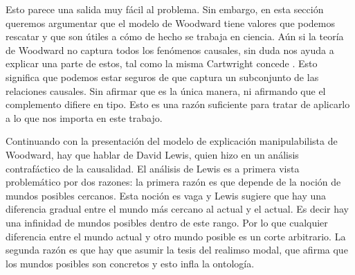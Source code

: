 Esto parece una salida muy fácil al problema. Sin embargo, en esta sección queremos argumentar que el modelo de Woodward tiene valores que podemos rescatar y que son útiles a cómo de hecho se trabaja en ciencia. Aún si la teoría de Woodward no captura todos los fenómenos causales, sin duda nos ayuda a explicar una parte de estos, tal como la misma Cartwright concede \citeyear[cap. 7]{Cartwright2007}. Esto significa que podemos estar seguros de que captura un subconjunto de las relaciones causales. Sin afirmar que es la única manera, ni afirmando que el complemento difiere en tipo. Esto es una razón suficiente para tratar de aplicarlo a lo que nos importa en este trabajo.



Continuando con la presentación del modelo de explicación manipulabilista de Woodward, hay que hablar de David Lewis, quien hizo en  \citeyear{Lewis1973a} un análisis contrafáctico de la causalidad. El análisis de Lewis es a primera vista problemático por dos razones: la primera razón es que depende de la noción de mundos posibles cercanos. Esta noción es vaga y Lewis sugiere que hay una diferencia gradual entre el mundo más cercano al actual y el actual. Es decir hay una infinidad de mundos posibles dentro de este rango. Por lo que cualquier diferencia entre el mundo actual y otro mundo posible es un corte arbitrario. La segunda razón es que hay que asumir la tesis del realimso modal, que afirma que los mundos posibles son concretos y esto infla la ontología.

